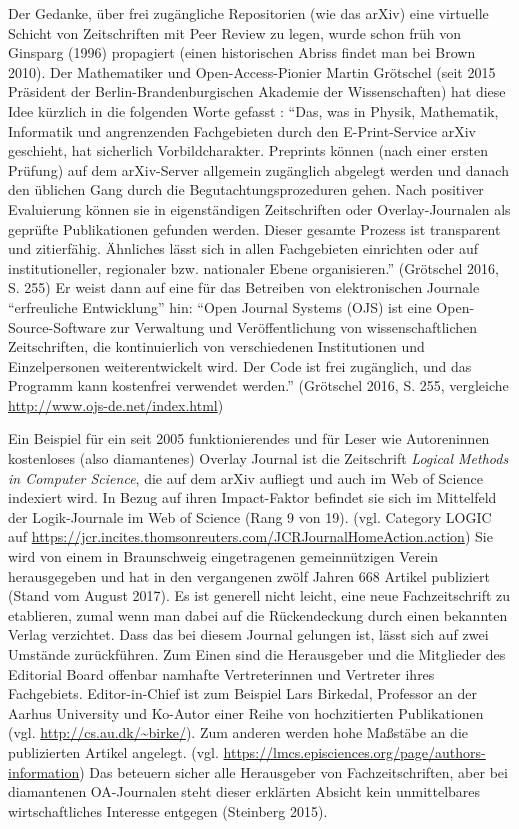 \documentclass[a4paper,
fontsize=11pt,
oneside,
numbers=noperiodatend,
parskip=half-,
bibliography=totoc,
final
]{scrartcl}
\begin{document}
Der Gedanke, über frei zugängliche Repositorien (wie das arXiv) eine
virtuelle Schicht von Zeitschriften mit Peer Review zu legen, wurde
schon früh von Ginsparg (1996) propagiert (einen historischen Abriss
findet man bei Brown 2010). Der Mathematiker und Open-Access-Pionier
Martin Grötschel (seit 2015 Präsident der Berlin-Brandenburgischen
Akademie der Wissenschaften) hat diese Idee kürzlich in die folgenden
Worte gefasst : \enquote{Das, was in Physik, Mathematik, Informatik und
angrenzenden Fachgebieten durch den E-Print-Service arXiv geschieht, hat
sicherlich Vorbildcharakter. Preprints können (nach einer ersten
Prüfung) auf dem arXiv-Server allgemein zugänglich abgelegt werden und
danach den üblichen Gang durch die Begutachtungsprozeduren gehen. Nach
positiver Evaluierung können sie in eigenständigen Zeitschriften oder
Overlay-Journalen als geprüfte Publikationen gefunden werden. Dieser
gesamte Prozess ist transparent und zitierfähig. Ähnliches lässt sich in
allen Fachgebieten einrichten oder auf institutioneller, regionaler bzw.
nationaler Ebene organisieren.} (Grötschel 2016, S. 255) Er weist dann
auf eine für das Betreiben von elektronischen Journale
\enquote{erfreuliche Entwicklung} hin: \enquote{Open Journal Systems
(OJS) ist eine Open-Source-Software zur Verwaltung und Veröffentlichung
von wissenschaftlichen Zeitschriften, die kontinuierlich von
verschiedenen Institutionen und Einzelpersonen weiterentwickelt wird.
Der Code ist frei zugänglich, und das Programm kann kostenfrei verwendet
werden.} (Grötschel 2016, S. 255, vergleiche
\url{http://www.ojs-de.net/index.html})

Ein Beispiel für ein seit 2005 funktionierendes und für Leser wie
Autoreninnen kostenloses (also diamantenes) Overlay Journal ist die
Zeitschrift \emph{Logical Methods in Computer Science}, die auf dem
arXiv aufliegt und auch im Web of Science indexiert wird. In Bezug auf
ihren Impact-Faktor befindet sie sich im Mittelfeld der Logik-Journale
im Web of Science (Rang 9 von 19). (vgl. Category LOGIC auf
\url{https://jcr.incites.thomsonreuters.com/JCRJournalHomeAction.action})
Sie wird von einem in Braunschweig eingetragenen gemeinnützigen Verein
herausgegeben und hat in den vergangenen zwölf Jahren 668 Artikel
publiziert (Stand vom August 2017). Es ist generell nicht leicht, eine
neue Fachzeitschrift zu etablieren, zumal wenn man dabei auf die
Rückendeckung durch einen bekannten Verlag verzichtet. Dass das bei
diesem Journal gelungen ist, lässt sich auf zwei Umstände zurückführen.
Zum Einen sind die Herausgeber und die Mitglieder des Editorial Board
offenbar namhafte Vertreterinnen und Vertreter ihres Fachgebiets.
Editor-in-Chief ist zum Beispiel Lars Birkedal, Professor an der Aarhus
University und Ko-Autor einer Reihe von hochzitierten Publikationen
(vgl. \url{http://cs.au.dk/~birke/}). Zum anderen werden hohe Maßstäbe
an die publizierten Artikel angelegt. (vgl.
\url{https://lmcs.episciences.org/page/authors-information}) Das
beteuern sicher alle Herausgeber von Fachzeitschriften, aber bei
diamantenen OA-Journalen steht dieser erklärten Absicht kein
unmittelbares wirtschaftliches Interesse entgegen (Steinberg 2015).
\end{document}
